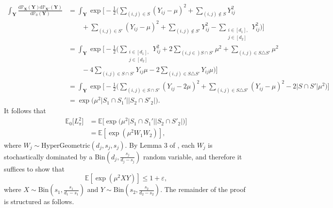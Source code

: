 \documentclass{article}
\newcommand{\D}{\textrm{d}}
\newcommand{\X}{\mathbf{X}}
\newcommand{\Y}{\mathbf{Y}}
\newcommand{\bbP}{\mathbb{P}}
\newcommand{\EE}{\mathbb{E}}
\newcommand{\eps}{\varepsilon} %
\theoremstyle{remark}
\begin{document}
\begin{align*}
    \int_\Y\frac{\D \bbP_\X(\Y)\D \bbP_{\X'}(\Y)}{\D \bbP_0(\Y)} &= \int_\Y\exp\Big[-\frac12\Big(\sum_{(i,j) \in S}(Y_{ij} - \mu)^2 +
    \sum_{(i,j) \notin S}Y_{ij}^2  \\
    &\quad \quad  + \sum_{(i,j) \in S'}(Y_{ij} - \mu)^2 + \sum_{(i,j) \notin S'}Y_{ij}^2 - \sum_{\substack{i \in [d_1], \\ j \in [d_2]}}Y_{ij}^2\Big)\Big] \\
    &= \int_\Y\exp\Big[-\frac12\Big(\sum_{\substack{i \in [d_1], \\ j \in [d_2]}}Y^2_{ij} + 2\sum_{(i,j \in )S \cap S'}\mu^2 + \sum_{(i,j) \in S \triangle S'}\mu^2 \\
    &\quad \quad - 4\sum_{(i,j) \in S \cap S'}Y_{ij}\mu - 2\sum_{(i,j) \in S \triangle S'}Y_{ij}\mu\Big)\Big] \\
    &= \int_\Y\exp\Big[-\frac12\Big(\sum_{(i,j) \in S \cap S'}(Y_{ij} - 2\mu)^2 + \sum_{(i,j) \in S \triangle S'}(Y_{ij} - \mu)^2 - 2|S \cap S'|\mu^2\Big)\Big] \\
    &= \exp\Big(\mu^2|S_1 \cap S_1'||S_2 \cap S'_2|\Big).
\end{align*}
It follows that
\begin{align*}
    \EE_0\big[L_\pi^2\big] &= \EE\Big[\exp\Big(\mu^2|S_1 \cap S_1'||S_2 \cap S'_2|\Big)\Big] \\
&=\EE[\exp(\mu^2W_1W_2)],
\end{align*}
where $W_j \sim \text{HyperGeometric}(d_j, s_j, s_j)$. By Lemma 3 of \citet{arias2011global}, each $W_j$ is stochastically dominated by a Bin$(d_j, \frac{s_j}{d_j - s_j})$ random variable, and therefore it suffices to show that
\begin{equation}\label{eq_mgf_goal}
    \EE[\exp(\mu^2XY)] \leq 1+\eps,
\end{equation}
where $X \sim \text{Bin}(s_1, \frac{s_1}{d_1 - s_1})$ and $Y \sim \text{Bin}(s_2, \frac{s_2}{d_2 - s_2})$. The remainder of the proof is structured as follows.
\end{document}
